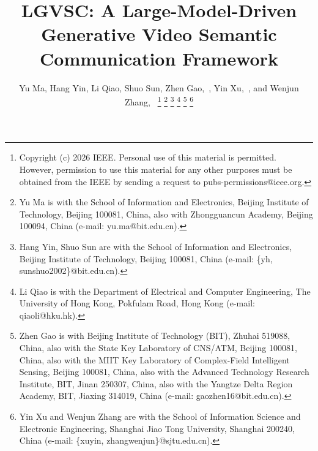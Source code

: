 \documentclass[10pt,journal]{IEEEtran}
\begin{document}
\title{LGVSC: A Large-Model-Driven Generative Video Semantic Communication Framework}

\author{Yu Ma, Hang Yin, Li Qiao, Shuo Sun, 
Zhen Gao,~, Yin Xu,~, and Wenjun Zhang,~
 \vspace{-5mm}
\thanks{Copyright (c) 2026 IEEE. Personal use of this material is permitted. However, permission to use this material for any other purposes must be obtained from the IEEE by sending a request to pubs-permissions@ieee.org.}
\thanks{Yu Ma is with the School of Information and Electronics, Beijing Institute of Technology, Beijing 100081, China, also with Zhongguancun Academy, Beijing 100094, China (e-mail: yu.ma@bit.edu.cn).}
\thanks{Hang Yin, Shuo Sun are with the School of Information and Electronics, Beijing Institute of Technology, Beijing 100081, China (e-mail: \{yh, sunshuo2002\}@bit.edu.cn).}
\thanks{Li Qiao is with the Department of Electrical and Computer Engineering, The University of Hong Kong, Pokfulam Road, Hong Kong (e-mail: qiaoli@hku.hk).}
\thanks{Zhen Gao is with Beijing Institute of Technology (BIT), Zhuhai 519088, China, also with the State Key Laboratory of CNS/ATM, Beijing 100081, China, also with the MIIT Key Laboratory of Complex-Field Intelligent Sensing, Beijing 100081, China, also with the Advanced Technology Research Institute, BIT, Jinan 250307, China, also with the Yangtze Delta Region Academy, BIT, Jiaxing 314019, China (e-mail: gaozhen16@bit.edu.cn).}
\thanks{Yin Xu and Wenjun Zhang are with the School of Information Science and Electronic Engineering, Shanghai Jiao Tong University, Shanghai 200240, China (e-mail: \{xuyin, zhangwenjun\}@sjtu.edu.cn).}
}
\end{document}
